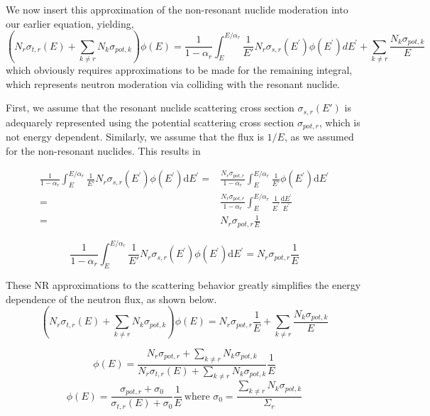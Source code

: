 \documentclass[10pt]{article}
\begin{document}
We now insert this approximation of the non-resonant nuclide moderation into our earlier equation, yielding,
\begin{equation}\left(N_{r}\sigma_{t,r}(E)+\sum\limits_{k\neq r}N_{k}\sigma_{pot,k}\right)\phi(E) = \frac{1}{1-\alpha_{r}}\int_{E}^{E/\alpha_{r}}\frac{1}{E'}N_{r}\sigma_{s,r}\left(E^{\prime}\right)\phi\left(E^{\prime}\right)dE^{\prime} + \sum\limits_{k\neq r}\frac{N_{k}\sigma_{pot,k}}{E}\end{equation}
which obviously requires approximations to be made for the remaining integral, which represents neutron moderation via colliding with the resonant nuclide.\par
First, we assume that the resonant nuclide scattering cross section $\sigma_{s,r}(E')$ is adequarely represented using the potential scattering cross section $\sigma_{pot,r}$, which is not energy dependent. Similarly, we assume that the flux is $1/E$, as we assumed for the non-resonant nuclides. This results in

\begin{align}\frac{1}{1-\alpha_{r}}\int_{E}^{E/\alpha_{r}}\frac{1}{E'}N_{r}\sigma_{s,r}\left(E^{\prime}\right)\phi\left(E^{\prime}\right)\mathrm{d}E^{\prime} = &\frac{N_{r}\sigma_{pot,r}}{1-\alpha_{r}}\int_{E}^{E/\alpha_{r}}\frac{1}{E'}\phi\left(E^{\prime}\right)\mathrm{d}E^{\prime} 
  \\
  =&\frac{N_{r}\sigma_{pot,r}}{1-\alpha_{r}}\int_{E}^{E/\alpha_{r}}\frac{1}{E^{\prime}}\frac{\mathrm{d}E^{\prime}}{E^{\prime}}
  \\
  =&N_{r}\sigma_{pot,r}\frac{1}{E}
\end{align}

\begin{equation}\boxed{\frac{1}{1-\alpha_{r}}\int_{E}^{E/\alpha_{r}}\frac{1}{E'}N_{r}\sigma_{s,r}\left(E^{\prime}\right)\phi\left(E^{\prime}\right)\mathrm{d}E^{\prime}=N_{r}\sigma_{pot,r}\frac{1}{E}}\label{eq:NR-mainConclusion2}\end{equation}

These NR approximations to the scattering behavior greatly simplifies the energy dependence of the neutron flux, as shown below.
\begin{equation}\left(N_{r}\sigma_{t,r}(E)+\sum\limits_{k\neq r}N_{k}\sigma_{pot,k}\right)\phi(E) = N_{r}\sigma_{pot,r}\frac{1}{E} + \sum\limits_{k\neq r}\frac{N_{k}\sigma_{pot,k}}{E}\end{equation}

\begin{equation}\phi(E)=\frac{N_{r}\sigma_{pot,r}+\sum\limits_{k\neq r}N_{k}\sigma_{pot,k}}{N_{r}\sigma_{t,r}(E)+\sum\limits_{k\neq r}N_{k}\sigma_{pot,k}}\frac{1}{E}\end{equation}
\begin{equation}\boxed{\phi(E)=\frac{\sigma_{pot,r}+\sigma_{0}}{\sigma_{t,r}(E)+\sigma_{0}}\frac{1}{E}~\mbox{where }\sigma_0=\frac{\sum\limits_{k\neq r}N_k\sigma_{pot,k}}{\Sigma_r}}\end{equation}
\end{document}
